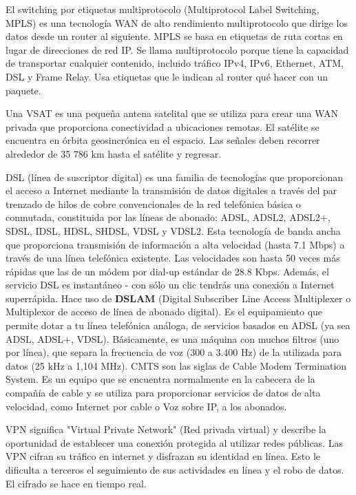 \documentclass[
	12pt, %
	fleqn, %
	a4paper, %
	oneside, %
]{LegrandOrangeBook}
\begin{document}
\begin{definition}[MPLS]
El switching por etiquetas multiprotocolo  (Multiprotocol Label Switching, MPLS) es una  tecnología WAN de alto rendimiento multiprotocolo  que dirige los datos desde un router al siguiente. 
MPLS se basa en etiquetas de ruta cortas en lugar de direcciones de red IP. Se llama multiprotocolo porque tiene la capacidad de  transportar cualquier contenido, incluido tráfico IPv4,  IPv6, Ethernet, ATM, DSL y Frame Relay. Usa etiquetas que le indican al router qué hacer con un paquete.
\end{definition}
\begin{definition}[VSAT]
Una VSAT es una pequeña antena satelital que se  utiliza para crear una WAN privada que proporciona  conectividad a ubicaciones remotas. El satélite se encuentra en órbita geosincrónica en el espacio. Las señales deben recorrer alrededor de  35 786 km hasta el satélite y regresar.
\end{definition}
\begin{definition}[DSL]
DSL (línea de suscriptor digital) es una familia de tecnologías que proporcionan el acceso a Internet mediante la transmisión de datos digitales a través del par trenzado de hilos de cobre convencionales de la red telefónica básica o conmutada, constituida por las líneas de abonado: ADSL, ADSL2, ADSL2+, SDSL, IDSL, HDSL, SHDSL, VDSL y VDSL2. Esta tecnología de banda ancha que proporciona transmisión de información a alta velocidad (hasta 7.1 Mbps) a través de una línea telefónica existente. Las velocidades son hasta 50 veces más rápidas que las de un módem por dial-up estándar de 28.8 Kbps. Además, el servicio DSL es instantáneo - con sólo un clic tendrás una conexión a Internet superrápida. Hace uso de \textbf{DSLAM} (Digital Subscriber Line Access Multiplexer o Multiplexor de acceso de línea de abonado digital). Es el equipamiento que permite dotar a tu línea telefónica análoga, de servicios basados en ADSL (ya sea ADSL, ADSL+, VDSL). Básicamente, es una máquina con muchos filtros (uno por línea), que separa la frecuencia de voz (300 a 3.400 Hz) de la utilizada para datos (25 kHz a 1,104 MHz). CMTS son las siglas de Cable Modem Termination System. Es un equipo que se encuentra normalmente en la cabecera de la compañía de cable y se utiliza para proporcionar servicios de datos de alta velocidad, como Internet por cable o Voz sobre IP, a los abonados.
\end{definition}
\begin{definition}[VPN]
VPN significa "Virtual Private Network" (Red privada virtual) y describe la oportunidad de establecer una conexión protegida al utilizar redes públicas. Las VPN cifran su tráfico en internet y disfrazan su identidad en línea. Esto le dificulta a terceros el seguimiento de sus actividades en línea y el robo de datos. El cifrado se hace en tiempo real.
\end{definition}
\end{document}
